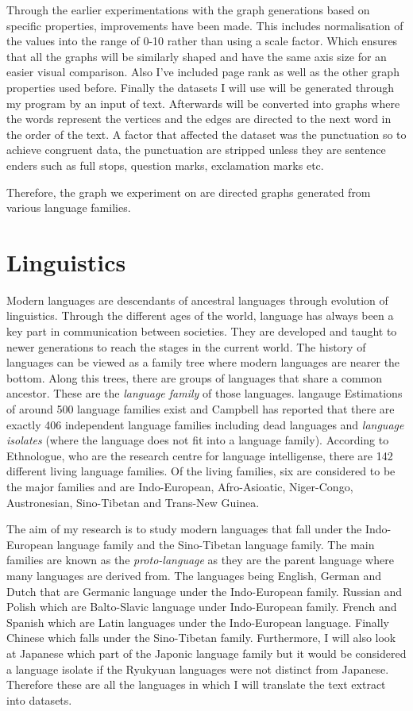 Through the earlier experimentations with the graph generations based on specific properties, improvements have been made. This includes normalisation of the values into the range of 0-10 rather than using a scale factor. Which ensures that all the graphs will be similarly shaped and have the same axis size for an easier visual comparison. Also I've included page rank as well as the other graph properties used before. Finally the datasets I will use will be generated through my program by an input of text. Afterwards will be converted into graphs where the words represent the vertices and the edges are directed to the next word in the order of the text. A factor that affected the dataset was the punctuation so to achieve congruent data, the punctuation are stripped unless they are sentence enders such as full stops, question marks, exclamation marks etc. 

Therefore, the graph we experiment on are directed graphs generated from various language families.

\section{Linguistics}
Modern languages are descendants of ancestral languages through evolution of linguistics. Through the different ages of the world, language has always been a key part in communication between societies. They are developed and taught to newer generations to reach the stages in the current world. The history of languages can be viewed as a family tree where modern languages are nearer the bottom. Along this trees, there are groups of languages that share a common ancestor. These are the \emph{language family} of those languages.
langauge
Estimations of around 500 language families exist and Campbell \cite{campbell2018many} has reported that there are exactly 406 independent language families including dead languages and \emph{language isolates} (where the language does not fit into a language family). According to Ethnologue\cite{eberhard2023a}, who are the research centre for language intelligense, there are 142 different living language families. Of the living families, six are considered to be the major families and are Indo-European, Afro-Asioatic, Niger-Congo, Austronesian, Sino-Tibetan and Trans-New Guinea.

The aim of my research is to study modern languages that fall under the Indo-European language family and the Sino-Tibetan language family. The main families are known as the \emph{proto-language} as they are the parent language where many languages are derived from\cite{rowe2022concise}. The languages being English, German and Dutch that are Germanic language under the Indo-European family. Russian and Polish which are Balto-Slavic language under Indo-European family.  French and Spanish which are Latin languages under the Indo-European language. Finally Chinese which falls under the Sino-Tibetan family. Furthermore, I will also look at Japanese which part of the Japonic language family but it would be considered a language isolate if the Ryukyuan languages were not distinct from Japanese\cite{campbell2010language}. Therefore these are all the languages in which I will translate the text extract into datasets.

